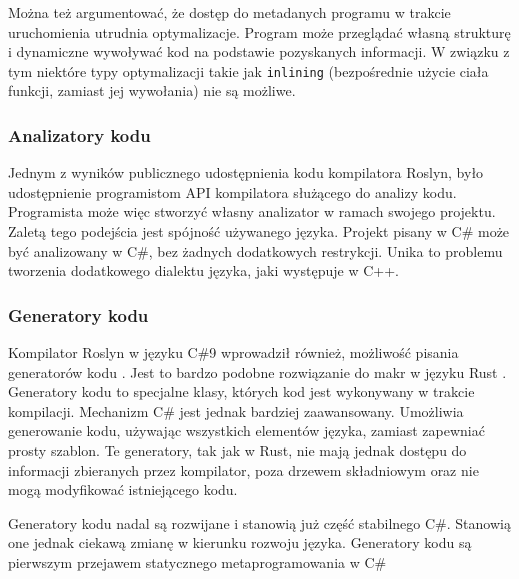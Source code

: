 Można też argumentować, że dostęp do metadanych programu w trakcie uruchomienia utrudnia optymalizacje.
Program może przeglądać własną strukturę i dynamiczne wywoływać kod na podstawie pozyskanych informacji.
W związku z tym niektóre typy optymalizacji takie jak \lstinline{inlining} (bezpośrednie użycie ciała funkcji, zamiast jej wywołania) nie są możliwe.%

\subsubsection{Analizatory kodu}

Jednym z wyników publicznego udostępnienia kodu kompilatora Roslyn\cite{roslyn}, było udostępnienie programistom API kompilatora służącego do analizy kodu.
Programista może więc stworzyć własny analizator w ramach swojego projektu.
Zaletą tego podejścia  jest spójność używanego języka.
Projekt pisany w C\# może być analizowany w C\#, bez żadnych dodatkowych restrykcji.
Unika to problemu tworzenia dodatkowego dialektu języka, jaki występuje w C++.

\subsubsection{Generatory kodu}

Kompilator Roslyn w języku C\#9 wprowadził również, możliwość pisania generatorów kodu \cite{csharp:source_generators,roslyn}.
Jest to bardzo podobne rozwiązanie do makr w języku Rust \cite{rust}. Generatory kodu to specjalne klasy, których kod jest wykonywany w trakcie kompilacji. 
Mechanizm C\# jest jednak bardziej zaawansowany.
Umożliwia generowanie kodu, używając wszystkich elementów języka, zamiast zapewniać prosty szablon.
Te generatory, tak jak w Rust, nie mają jednak dostępu do informacji zbieranych przez kompilator, poza drzewem składniowym oraz nie mogą modyfikować istniejącego kodu.

Generatory kodu nadal są rozwijane i stanowią już część stabilnego C\#.
Stanowią one jednak ciekawą zmianę w kierunku rozwoju języka. 
Generatory kodu są pierwszym przejawem statycznego metaprogramowania w C\#

